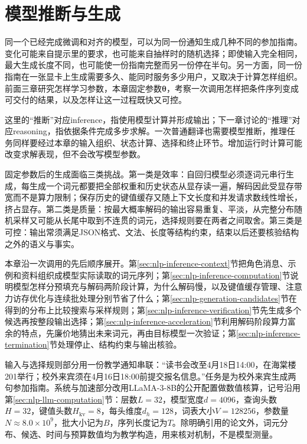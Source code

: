 \chapter{模型推断与生成}
\label{chap:nlp-model-inference}

同一个已经完成微调和对齐的模型，可以为同一份通知生成几种不同的参加指南。变化可能来自提示里的要求，也可能来自抽样时的随机选择；即使输入完全相同，最大生成长度不同，也可能使一份指南完整而另一份停在半句。另一方面，同一份指南在一张显卡上生成需要多久、能同时服务多少用户，又取决于计算怎样组织。前面三章研究怎样学习参数，本章固定参数$\bm{\theta}$，考察一次调用怎样把条件序列变成可交付的结果，以及怎样让这一过程既快又可控。

这里的“推断”对应inference，指使用模型计算并形成输出；下一章讨论的“推理”对应reasoning，指依据条件完成多步求解。一次普通翻译也需要模型推断，推理任务同样要经过本章的输入组织、状态计算、选择和终止环节。增加运行时计算可能改变求解表现，但不会改写模型参数。

固定参数后的生成面临三类挑战。第一类是效率：自回归模型必须逐词元串行生成，每生成一个词元都要把全部权重和历史状态从显存读一遍，解码因此受显存带宽而不是算力限制；保存历史的键值缓存又随上下文长度和并发请求数线性增长，挤占显存。第二类是质量：按最大概率解码的输出容易重复、平淡，从完整分布随机采样又可能从长尾中取到不连贯的词元，选择规则要在两者之间取舍。第三类是可控：输出常须满足JSON格式、文法、长度等结构约束，结束以后还要核验结构之外的语义与事实。

本章沿一次调用的先后顺序展开。第\ref{sec:nlp-inference-context}节把角色消息、示例和资料组织成模型实际读取的词元序列；第\ref{sec:nlp-inference-computation}节说明模型怎样分预填充与解码两阶段计算，为什么解码慢，以及键值缓存管理、注意力访存优化与连续批处理分别节省了什么；第\ref{sec:nlp-generation-candidates}节在得到的分布上比较搜索与采样规则；第\ref{sec:nlp-inference-verification}节先生成多个候选再按整段输出选择；第\ref{sec:nlp-inference-acceleration}节利用解码阶段算力富余的特点，先廉价地猜出未来词元，再由目标模型一次验证；第\ref{sec:nlp-inference-termination}节处理停止、结构约束与输出核验。

输入与选择规则部分用一份教学通知串联：“读书会改至4月18日14:00，在海棠楼201举行；校外来宾须在4月16日18:00前提交报名信息。”任务是为校外来宾生成两句参加指南。系统与加速部分改用LLaMA-3-8B的公开配置做数值核算，记号沿用第\ref{sec:nlp-llm-computation}节：层数$L=32$，模型宽度$d=4096$，查询头数$H=32$，键值头数$H_{\mathrm{kv}}=8$，每头维度$d_h=128$，词表大小$V=128256$，参数量$N\approx8.0\times10^9$，批大小记为$B$，序列长度记为$T$。除明确引用的论文外，词元分布、候选、时间与预算数值均为教学构造，用来核对机制，不是模型测量。

